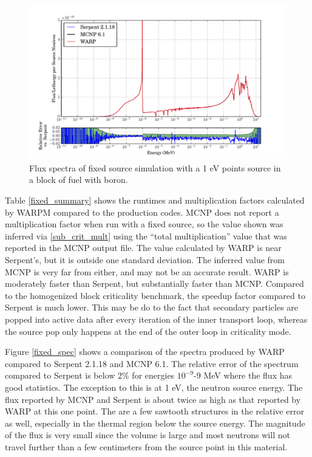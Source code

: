 \begin{figure}[h!]
\centering
\includegraphics[width=\textwidth,trim= 1cm 0cm 1cm 0cm]{graphics/finalresults/fixed_spec_homfuel.pdf}
\caption{Flux spectra of fixed source simulation with a 1 eV points source in a block of fuel with boron. \label{fixed_spec_homfuel} }
\end{figure}

Table \ref{fixed_summary} shows the runtimes and multiplication factors calculated by WARPM compared to the production codes.  MCNP does not report a multiplication factor when run with a fixed source, so the value shown was inferred via \eqref{sub_crit_mult} using the ``total multiplication'' value that was reported in the MCNP output file.  The value calculated by WARP is near Serpent's, but it is outside one standard deviation.  The inferred value from MCNP is very far from either, and may not be an accurate result.  WARP is moderately faster than Serpent, but substantially faster than MCNP.  Compared to the homogenized block criticality benchmark, the speedup factor compared to Serpent is much lower.  This may be do to the fact that secondary particles are popped into active data after every iteration of the inner transport loop, whereas the source pop only happens at the end of the outer loop in criticality mode.

Figure \ref{fixed_spec} shows a comparison of the spectra produced by WARP compared to Serpent 2.1.18 and MCNP 6.1.  The relative error of the spectrum compared to Serpent is below 2\% for energies $10^{-9}$-$9$ MeV where the flux has good statistics.  The exception to this is at 1 eV, the neutron source energy.  The flux reported by MCNP and Serpent is about twice as high as that reported by WARP at this one point.  The are a few sawtooth structures in the relative error as well, especially in the thermal region below the source energy.  The magnitude of the flux is very small since the volume is large and most neutrons will not travel further than a few centimeters from the source point in this material.

